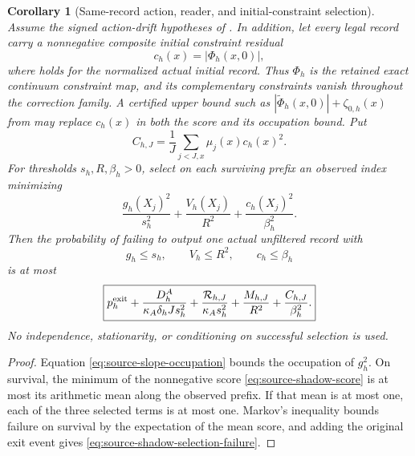 \documentclass[11pt]{article}
\numberwithin{equation}{section}
\newtheorem{corollary}[corollary]{Corollary}
\theoremstyle{definition}
\theoremstyle{remark}
\newcommand{\abs}[1]{\lvert#1\rvert}
\begin{document}
\begin{corollary}[Same-record action, reader, and initial-constraint selection]
\label{cor:source-selected-shadow-budgets}
Assume the signed action-drift hypotheses of .  In
addition, let every legal record carry a nonnegative composite initial
constraint residual
\begin{equation}
 c_h(x)=\abs{\Phi_h(x,0)},
 \label{eq:source-composite-charge}
\end{equation}
where  holds for the normalized actual
initial record. Thus $\Phi_h$ is the retained exact continuum constraint
map, and its complementary constraints vanish throughout the correction
family. A certified upper bound such as
$|\widetilde\Phi_h(x,0)|+\zeta_{0,h}(x)$ from
 may replace $c_h(x)$ in both the
score and its occupation bound. Put
\begin{equation}
 C_{h,J}=\frac1J\sum_{j<J,x}\mu_j(x)c_h(x)^2.
 \label{eq:source-charge-occupation}
\end{equation}
For thresholds $s_h,R,\beta_h>0$, select on each surviving prefix an observed
index minimizing
\begin{equation}
 \frac{g_h(X_j)^2}{s_h^2}
 +\frac{V_h(X_j)}{R^2}
 +\frac{c_h(X_j)^2}{\beta_h^2}.
 \label{eq:source-shadow-score}
\end{equation}
Then the probability of failing to output one actual unfiltered record with
\begin{equation}
 g_h\le s_h,
 \qquad
 V_h\le R^2,
 \qquad
 c_h\le\beta_h
 \label{eq:source-shadow-selected}
\end{equation}
is at most
\begin{equation}
 \boxed{
 p_h^{\rm exit}
 +\frac{D_h^A}{\kappa_A\delta_hJ s_h^2}
 +\frac{\mathcal R_{h,J}}{\kappa_A s_h^2}
 +\frac{M_{h,J}}{R^2}
 +\frac{C_{h,J}}{\beta_h^2}.}
 \label{eq:source-shadow-selection-failure}
\end{equation}
No independence, stationarity, or conditioning on successful selection is
used.
\end{corollary}
\begin{proof}
Equation \eqref{eq:source-slope-occupation} bounds the occupation of $g_h^2$.
On survival, the minimum of the nonnegative score
\eqref{eq:source-shadow-score} is at most its arithmetic mean along the
observed prefix.  If that mean is at most one, each of the three selected
terms is at most one.  Markov's inequality bounds failure on survival by the
expectation of the mean score, and adding the original exit event gives
\eqref{eq:source-shadow-selection-failure}.
\end{proof}
\end{document}
